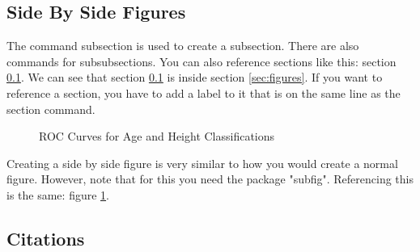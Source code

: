\documentclass{article} %
\begin{document}
\subsection{Side By Side Figures} \label{sec:sidebyside}

The command subsection is used to create a subsection. There are also commands for subsubsections.
You can also reference sections like this: section \ref{sec:sidebyside}.
We can see that section \ref{sec:sidebyside} is inside section \ref{sec:figures}.
If you want to reference a section, you have to add a label to it that is on the same line as the section command.


\begin{figure}[h!]
    \centering
    \qquad
    \caption{ROC Curves for Age and Height Classifications}%
    \label{fig:rocCurves}
\end{figure}


Creating a side by side figure is very similar to how you would create a normal figure.
However, note that for this you need the package "subfig". Referencing this is the same:
figure \ref{fig:rocCurves}.


\subsection{Citations}
\end{document}
